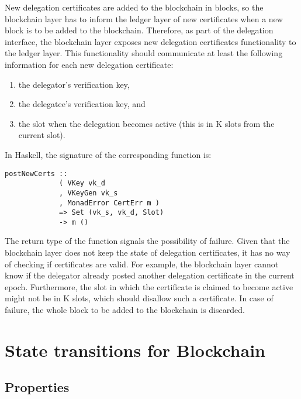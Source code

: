 \documentclass[11pt,a4paper]{article}
\begin{document}
New delegation certificates are added to the blockchain in blocks, so the
blockchain layer has to inform the ledger layer of new certificates when a new
block is to be added to the blockchain.
%
Therefore, as part of the delegation interface, the blockchain layer exposes
new delegation certificates functionality to the ledger layer.
%
This functionality should communicate at least the following information for
each new delegation certificate:
%
\begin{enumerate}
\item the delegator's verification key,
%
\item the delegatee's verification key, and
%
\item the slot when the delegation becomes active (this is in K slots from the
  current slot).
\end{enumerate}
%
In Haskell, the signature of the corresponding function is:
%
\begin{lstlisting}
postNewCerts ::
             ( VKey vk_d
             , VKeyGen vk_s
             , MonadError CertErr m )
             => Set (vk_s, vk_d, Slot)
             -> m ()
\end{lstlisting}
%
The return type of the function signals the possibility of failure.
%
Given that the blockchain layer does not keep the state of delegation
certificates, it has no way of checking if certificates are valid.
%
For example, the blockchain layer cannot know if the delegator already posted
another delegation certificate in the current epoch.
%
Furthermore, the slot in which the certificate is claimed to become active
might not be in K slots, which should disallow such a certificate.
%
In case of failure, the whole block to be added to the blockchain is
discarded.


\section{State transitions for Blockchain}
\label{sec:state-trans-chain}

\subsection{Properties}
\label{sec:chain-properties}
\end{document}
